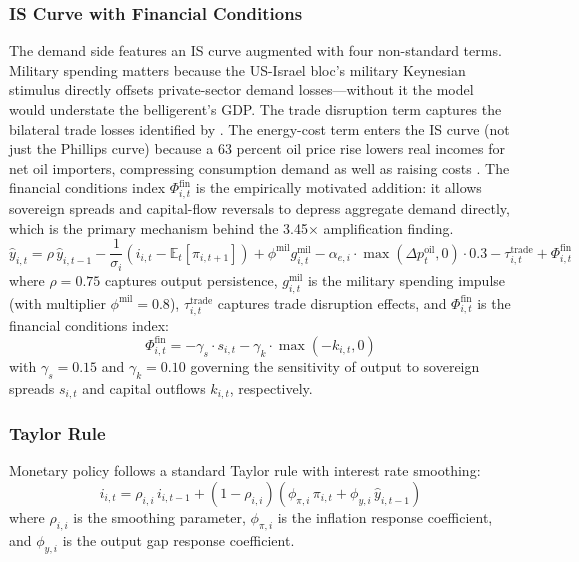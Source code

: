 \documentclass[12pt]{article}
\begin{document}
\subsubsection{IS Curve with Financial Conditions}

The demand side features an IS curve augmented with four non-standard terms. Military spending matters because the US-Israel bloc's military Keynesian stimulus directly offsets private-sector demand losses---without it the model would understate the belligerent's GDP. The trade disruption term captures the bilateral trade losses identified by \citet{federle2026price}. The energy-cost term enters the IS curve (not just the Phillips curve) because a 63 percent oil price rise lowers real incomes for net oil importers, compressing consumption demand as well as raising costs \citep{blanchard2007macroeconomic}. The financial conditions index $\Phi^{\text{fin}}_{i,t}$ is the empirically motivated addition: it allows sovereign spreads and capital-flow reversals to depress aggregate demand directly, which is the primary mechanism behind the 3.45$\times$ amplification finding.
\begin{equation}
\hat{y}_{i,t} = \rho \, \hat{y}_{i,t-1} - \frac{1}{\sigma_i}(i_{i,t} - \mathbb{E}_t[\pi_{i,t+1}]) + \phi^{\text{mil}} g^{\text{mil}}_{i,t} - \alpha_{e,i} \cdot \max(\Delta p^{\text{oil}}_t, 0) \cdot 0.3 - \tau^{\text{trade}}_{i,t} + \Phi^{\text{fin}}_{i,t}
\label{eq:is}
\end{equation}
where $\rho = 0.75$ captures output persistence, $g^{\text{mil}}_{i,t}$ is the military spending impulse (with multiplier $\phi^{\text{mil}} = 0.8$), $\tau^{\text{trade}}_{i,t}$ captures trade disruption effects, and $\Phi^{\text{fin}}_{i,t}$ is the financial conditions index:
\begin{equation}
\Phi^{\text{fin}}_{i,t} = -\gamma_s \cdot s_{i,t} - \gamma_k \cdot \max(-k_{i,t}, 0)
\label{eq:fci}
\end{equation}
with $\gamma_s = 0.15$ and $\gamma_k = 0.10$ governing the sensitivity of output to sovereign spreads $s_{i,t}$ and capital outflows $k_{i,t}$, respectively.

\subsubsection{Taylor Rule}

Monetary policy follows a standard Taylor rule with interest rate smoothing:
\begin{equation}
i_{i,t} = \rho_{i,i} \, i_{i,t-1} + (1 - \rho_{i,i})(\phi_{\pi,i} \, \pi_{i,t} + \phi_{y,i} \, \hat{y}_{i,t-1})
\label{eq:taylor}
\end{equation}
where $\rho_{i,i}$ is the smoothing parameter, $\phi_{\pi,i}$ is the inflation response coefficient, and $\phi_{y,i}$ is the output gap response coefficient.
\end{document}
